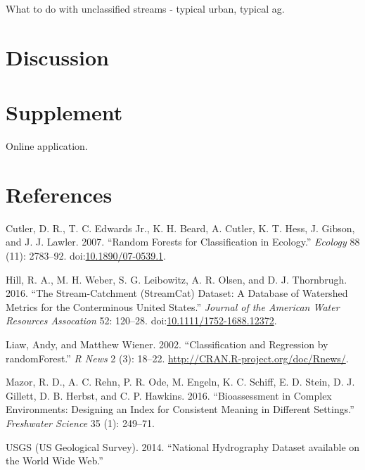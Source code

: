 \documentclass[]{article}
\begin{document}
What to do with unclassified streams - typical urban, typical ag.

\section{Discussion}\label{discussion}

\section{Supplement}\label{supplement}

Online application.

\section*{References}\label{references}

\hypertarget{refs}{}
\hypertarget{ref-Cutler07}{}
Cutler, D. R., T. C. Edwards Jr., K. H. Beard, A. Cutler, K. T. Hess, J.
Gibson, and J. J. Lawler. 2007. ``Random Forests for Classification in
Ecology.'' \emph{Ecology} 88 (11): 2783--92.
doi:\href{https://doi.org/10.1890/07-0539.1}{10.1890/07-0539.1}.

\hypertarget{ref-Hill16}{}
Hill, R. A., M. H. Weber, S. G. Leibowitz, A. R. Olsen, and D. J.
Thornbrugh. 2016. ``The Stream-Catchment (StreamCat) Dataset: A Database
of Watershed Metrics for the Conterminous United States.'' \emph{Journal
of the American Water Resources Assocation} 52: 120--28.
doi:\href{https://doi.org/10.1111/1752-1688.12372}{10.1111/1752-1688.12372}.

\hypertarget{ref-Liaw02}{}
Liaw, Andy, and Matthew Wiener. 2002. ``Classification and Regression by
randomForest.'' \emph{R News} 2 (3): 18--22.
\url{http://CRAN.R-project.org/doc/Rnews/}.

\hypertarget{ref-Mazor16}{}
Mazor, R. D., A. C. Rehn, P. R. Ode, M. Engeln, K. C. Schiff, E. D.
Stein, D. J. Gillett, D. B. Herbst, and C. P. Hawkins. 2016.
``Bioassessment in Complex Environments: Designing an Index for
Consistent Meaning in Different Settings.'' \emph{Freshwater Science} 35
(1): 249--71.

\hypertarget{ref-USGS14}{}
USGS (US Geological Survey). 2014. ``National Hydrography Dataset
available on the World Wide Web.''
\end{document}
